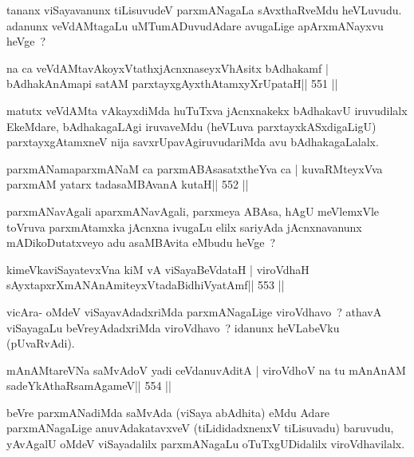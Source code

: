 \begin{artha}
tananx viSayavanunx tiLisuvudeV parxmANagaLa sAvxthaRveMdu heVLuvudu.
adanunx veVdAMtagaLu uMTumADuvudAdare avugaLige apArxmANayxvu heVge~?
\end{artha}

\begin{shl}
na ca veVdAMtavAkoyxVtathxjAcnxnaseyxVhAsitx bAdhakamf |
bAdhakAnAmapi satAM parxtayxgAyxthAtamxyXrUpataH\hfill || 551 ||
\end{shl}

\begin{artha}
matutx veVdAMta vAkayxdiMda huTuTxva jAcnxnakekx bAdhakavU iruvudilalx EkeMdare, bAdhakagaLAgi iruvaveMdu (heVLuva parxtayxkASxdigaLigU) parxtayxgAtamxneV nija savxrUpavAgiruvudariMda avu bAdhakagaLalalx.
\end{artha}

\begin{shl}
parxmANamaparxmANaM ca parxmABAsasatxtheYva ca |
kuvaRMteyxVva parxmAM yatarx tadasaMBAvanA kutaH\hfill || 552 ||
\end{shl}

\begin{artha}
parxmANavAgali aparxmANavAgali, parxmeya ABAsa, hAgU meVlemxVle
toVruva parxmAtamxka jAcnxna ivugaLu elilx sariyAda jAcnxnavanunx
mADikoDutatxveyo adu asaMBAvita eMbudu heVge~? 
\end{artha}

\begin{shl}
kimeVkaviSayatevxVna kiM vA viSayaBeVdataH |
viroVdhaH sAyxtapxrXmANAnAmiteyxVtadaBidhiVyatAmf\hfill || 553 ||
\end{shl}

\begin{artha}
vicAra- oMdeV viSayavAdadxriMda parxmANagaLige viroVdhavo~? athavA viSayagaLu beVreyAdadxriMda viroVdhavo~? idanunx heVLabeVku (pUvaRvAdi).
\end{artha}


\begin{shl}
mAnAMtareVNa saMvAdoV yadi ceVdanuvAditA |
viroVdhoV na tu mAnAnAM sadeYkAthaRsamAgameV\hfill || 554 ||
\end{shl}

\begin{artha}
beVre parxmANadiMda saMvAda (viSaya abAdhita) eMdu Adare parxmANagaLige anuvAdakatavxveV (tiLididadxnenxV tiLisuvadu) baruvudu, yAvAgalU oMdeV viSayadalilx parxmANagaLu oTuTxgUDidalilx viroVdhavilalx.
\end{artha}

